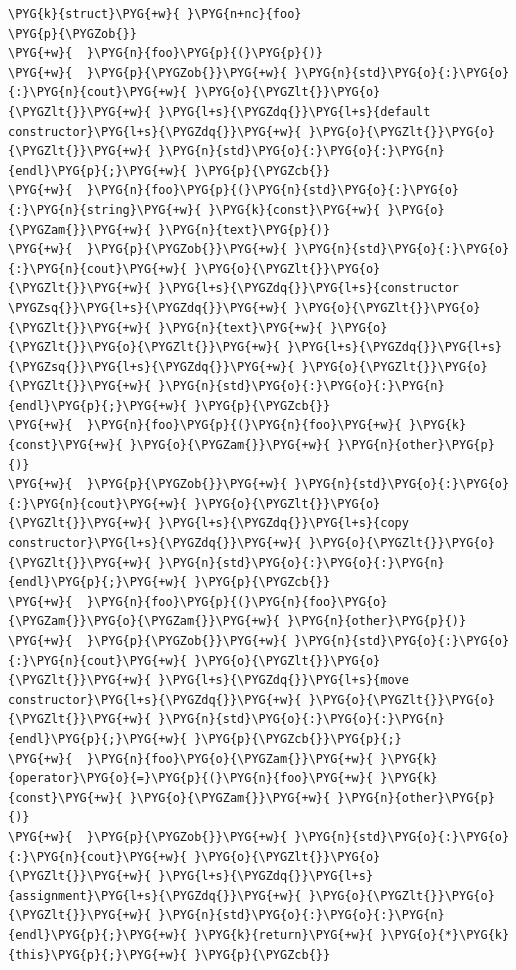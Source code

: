\begin{codeblockbg}
\begin{Verbatim}[commandchars=\\\{\},breaklines=true,breakanywhere=true,fontsize=\codefont,xleftmargin=17bp]
\PYG{k}{struct}\PYG{+w}{ }\PYG{n+nc}{foo}
\PYG{p}{\PYGZob{}}
\PYG{+w}{  }\PYG{n}{foo}\PYG{p}{(}\PYG{p}{)}
\PYG{+w}{  }\PYG{p}{\PYGZob{}}\PYG{+w}{ }\PYG{n}{std}\PYG{o}{:}\PYG{o}{:}\PYG{n}{cout}\PYG{+w}{ }\PYG{o}{\PYGZlt{}}\PYG{o}{\PYGZlt{}}\PYG{+w}{ }\PYG{l+s}{\PYGZdq{}}\PYG{l+s}{default constructor}\PYG{l+s}{\PYGZdq{}}\PYG{+w}{ }\PYG{o}{\PYGZlt{}}\PYG{o}{\PYGZlt{}}\PYG{+w}{ }\PYG{n}{std}\PYG{o}{:}\PYG{o}{:}\PYG{n}{endl}\PYG{p}{;}\PYG{+w}{ }\PYG{p}{\PYGZcb{}}
\PYG{+w}{  }\PYG{n}{foo}\PYG{p}{(}\PYG{n}{std}\PYG{o}{:}\PYG{o}{:}\PYG{n}{string}\PYG{+w}{ }\PYG{k}{const}\PYG{+w}{ }\PYG{o}{\PYGZam{}}\PYG{+w}{ }\PYG{n}{text}\PYG{p}{)}
\PYG{+w}{  }\PYG{p}{\PYGZob{}}\PYG{+w}{ }\PYG{n}{std}\PYG{o}{:}\PYG{o}{:}\PYG{n}{cout}\PYG{+w}{ }\PYG{o}{\PYGZlt{}}\PYG{o}{\PYGZlt{}}\PYG{+w}{ }\PYG{l+s}{\PYGZdq{}}\PYG{l+s}{constructor \PYGZsq{}}\PYG{l+s}{\PYGZdq{}}\PYG{+w}{ }\PYG{o}{\PYGZlt{}}\PYG{o}{\PYGZlt{}}\PYG{+w}{ }\PYG{n}{text}\PYG{+w}{ }\PYG{o}{\PYGZlt{}}\PYG{o}{\PYGZlt{}}\PYG{+w}{ }\PYG{l+s}{\PYGZdq{}}\PYG{l+s}{\PYGZsq{}}\PYG{l+s}{\PYGZdq{}}\PYG{+w}{ }\PYG{o}{\PYGZlt{}}\PYG{o}{\PYGZlt{}}\PYG{+w}{ }\PYG{n}{std}\PYG{o}{:}\PYG{o}{:}\PYG{n}{endl}\PYG{p}{;}\PYG{+w}{ }\PYG{p}{\PYGZcb{}}
\PYG{+w}{  }\PYG{n}{foo}\PYG{p}{(}\PYG{n}{foo}\PYG{+w}{ }\PYG{k}{const}\PYG{+w}{ }\PYG{o}{\PYGZam{}}\PYG{+w}{ }\PYG{n}{other}\PYG{p}{)}
\PYG{+w}{  }\PYG{p}{\PYGZob{}}\PYG{+w}{ }\PYG{n}{std}\PYG{o}{:}\PYG{o}{:}\PYG{n}{cout}\PYG{+w}{ }\PYG{o}{\PYGZlt{}}\PYG{o}{\PYGZlt{}}\PYG{+w}{ }\PYG{l+s}{\PYGZdq{}}\PYG{l+s}{copy constructor}\PYG{l+s}{\PYGZdq{}}\PYG{+w}{ }\PYG{o}{\PYGZlt{}}\PYG{o}{\PYGZlt{}}\PYG{+w}{ }\PYG{n}{std}\PYG{o}{:}\PYG{o}{:}\PYG{n}{endl}\PYG{p}{;}\PYG{+w}{ }\PYG{p}{\PYGZcb{}}
\PYG{+w}{  }\PYG{n}{foo}\PYG{p}{(}\PYG{n}{foo}\PYG{o}{\PYGZam{}}\PYG{o}{\PYGZam{}}\PYG{+w}{ }\PYG{n}{other}\PYG{p}{)}
\PYG{+w}{  }\PYG{p}{\PYGZob{}}\PYG{+w}{ }\PYG{n}{std}\PYG{o}{:}\PYG{o}{:}\PYG{n}{cout}\PYG{+w}{ }\PYG{o}{\PYGZlt{}}\PYG{o}{\PYGZlt{}}\PYG{+w}{ }\PYG{l+s}{\PYGZdq{}}\PYG{l+s}{move constructor}\PYG{l+s}{\PYGZdq{}}\PYG{+w}{ }\PYG{o}{\PYGZlt{}}\PYG{o}{\PYGZlt{}}\PYG{+w}{ }\PYG{n}{std}\PYG{o}{:}\PYG{o}{:}\PYG{n}{endl}\PYG{p}{;}\PYG{+w}{ }\PYG{p}{\PYGZcb{}}\PYG{p}{;}
\PYG{+w}{  }\PYG{n}{foo}\PYG{o}{\PYGZam{}}\PYG{+w}{ }\PYG{k}{operator}\PYG{o}{=}\PYG{p}{(}\PYG{n}{foo}\PYG{+w}{ }\PYG{k}{const}\PYG{+w}{ }\PYG{o}{\PYGZam{}}\PYG{+w}{ }\PYG{n}{other}\PYG{p}{)}
\PYG{+w}{  }\PYG{p}{\PYGZob{}}\PYG{+w}{ }\PYG{n}{std}\PYG{o}{:}\PYG{o}{:}\PYG{n}{cout}\PYG{+w}{ }\PYG{o}{\PYGZlt{}}\PYG{o}{\PYGZlt{}}\PYG{+w}{ }\PYG{l+s}{\PYGZdq{}}\PYG{l+s}{assignment}\PYG{l+s}{\PYGZdq{}}\PYG{+w}{ }\PYG{o}{\PYGZlt{}}\PYG{o}{\PYGZlt{}}\PYG{+w}{ }\PYG{n}{std}\PYG{o}{:}\PYG{o}{:}\PYG{n}{endl}\PYG{p}{;}\PYG{+w}{ }\PYG{k}{return}\PYG{+w}{ }\PYG{o}{*}\PYG{k}{this}\PYG{p}{;}\PYG{+w}{ }\PYG{p}{\PYGZcb{}}

\end{Verbatim}
\end{codeblockbg}
